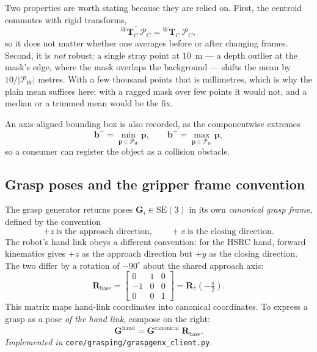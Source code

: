 \documentclass[11pt,a4paper]{article}
\newcommand{\SE}{\mathrm{SE}}
\newcommand{\Tf}[2]{{}^{#1}\mathbf{T}_{#2}}
\begin{document}
Two properties are worth stating because they are relied on. First, the centroid
commutes with rigid transforms,
\begin{equation}
\overline{\Tf{W}{C}\,\mathcal{P}_C} = \Tf{W}{C}\, \overline{\mathcal{P}_C},
\end{equation}
so it does not matter whether one averages before or after changing frames.
Second, it is \emph{not} robust: a single stray point at $10$~m --- a depth
outlier at the mask's edge, where the mask overlaps the background --- shifts the
mean by $10/|\mathcal{P}_W|$ metres. With a few thousand points that is
millimetres, which is why the plain mean suffices here; with a ragged mask over
few points it would not, and a median or a trimmed mean would be the fix.

An axis-aligned bounding box is also recorded, as the componentwise extremes
\begin{equation}
\mathbf{b}^{-} = \min_{\mathbf{p} \in \mathcal{P}_W} \mathbf{p}, \qquad
\mathbf{b}^{+} = \max_{\mathbf{p} \in \mathcal{P}_W} \mathbf{p},
\end{equation}
so a consumer can register the object as a collision obstacle.

\subsection{Grasp poses and the gripper frame convention}

The grasp generator returns poses $\mathbf{G}_i \in \SE(3)$ in its own
\emph{canonical grasp frame}, defined by the convention
\begin{equation}
+z \ \text{is the approach direction}, \qquad
+x \ \text{is the closing direction}.
\end{equation}
The robot's hand link obeys a different convention: for the HSRC hand, forward
kinematics gives $+z$ as the approach direction but $+y$ as the closing
direction. The two differ by a rotation of $-90^\circ$ about the shared approach
axis:
\begin{equation}
\mathbf{R}_{\text{base}} =
\begin{bmatrix}
0 & 1 & 0 \\
-1 & 0 & 0 \\
0 & 0 & 1
\end{bmatrix}
= \mathbf{R}_z(-\tfrac{\pi}{2}).
\end{equation}
This matrix maps hand-link coordinates into canonical coordinates. To express a
grasp as a pose \emph{of the hand link}, compose on the right:
\begin{equation}
\boxed{\;
\mathbf{G}^{\text{hand}} = \mathbf{G}^{\text{canonical}} \; \mathbf{R}_{\text{base}} .
\;}
\label{eq:baserot}
\end{equation}
\textit{Implemented in} \texttt{core/grasping/graspgenx\_client.py}.
\end{document}
